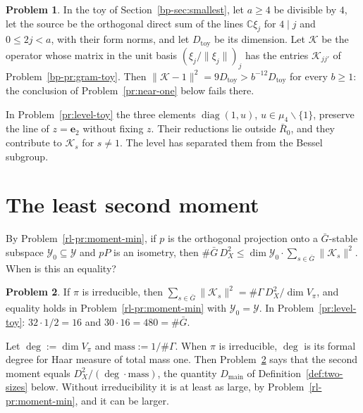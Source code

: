 \documentclass[reqno]{amsart}
\theoremstyle{definition}
\newtheorem{problem}{Problem}[section]
\theoremstyle{plain}
\theoremstyle{remark}
\newcommand{\C}{\mathbb{C}}
\newcommand{\Gb}{\bar G}
\newcommand{\Rb}{\bar R_0}
\newcommand{\Yc}{\mathcal Y}
\newcommand{\Kc}{\mathcal K}
\newcommand{\Dmain}{D_{\mathrm{main}}}
\newcommand{\diag}{\operatorname{diag}}
\begin{document}
\begin{problem}\label{pr:toy-fails}
In the toy of Section~\ref{bp-sec:smallest}, let \(a\ge4\) be divisible by \(4\), let the source be the orthogonal direct sum of the lines \(\C\xi_j\) for \(4\mid j\) and \(0\le2j<a\), with their form norms, and let \(D_{\mathrm{toy}}\) be its dimension.  Let \(\Kc\) be the operator whose matrix in the unit basis \((\xi_j/\lVert\xi_j\rVert)_j\) has the entries \(\Kc_{jj'}\) of Problem~\ref{bp-pr:gram-toy}.  Then \(\lVert\Kc-1\rVert^2=9D_{\mathrm{toy}}>b^{-12}D_{\mathrm{toy}}\) for every \(b\ge1\): the conclusion of Problem~\ref{pr:near-one} below fails there.
\end{problem}

In Problem~\ref{pr:level-toy} the three elements \(\diag(1,u)\), \(u\in\mu_4\smallsetminus\{1\}\), preserve the line of \(z=\mathbf e_2\) without fixing \(z\).  Their reductions lie outside \(\Rb\), and they contribute to \(\Kc_s\) for \(s\ne1\).  The level has separated them from the Bessel subgroup.

\section{The least second moment}\label{sec:least}

By Problem~\ref{rl-pr:moment-min}, if \(p\) is the orthogonal projection onto a \(\Gb\)-stable subspace \(\Yc_0\subseteq\Yc\) and \(pP\) is an isometry, then \(\#\Gb\,D_X^2\le\dim\Yc_0\cdot\sum_{s\in\Gb}\lVert\Kc_s\rVert^2\).  When is this an equality?

\begin{problem}\label{pr:schur-equality}
If \(\pi\) is irreducible, then \(\sum_{s\in\Gb}\lVert\Kc_s\rVert^2=\#\Gamma\,D_X^2/\dim V_\pi\), and equality holds in Problem~\ref{rl-pr:moment-min} with \(\Yc_0=\Yc\).  In Problem~\ref{pr:level-toy}: \(32\cdot1/2=16\) and \(30\cdot16=480=\#\Gb\).
\end{problem}

Let \(\deg:=\dim V_\pi\) and \(\mathrm{mass}:=1/\#\Gamma\).  When \(\pi\) is irreducible, \(\deg\) is its formal degree for Haar measure of total mass one.  Then Problem~\ref{pr:schur-equality} says that the second moment equals \(D_X^2/(\deg\cdot\mathrm{mass})\), the quantity \(\Dmain\) of Definition~\ref{def:two-sizes} below.  Without irreducibility it is at least as large, by Problem~\ref{rl-pr:moment-min}, and it can be larger.
\end{document}
